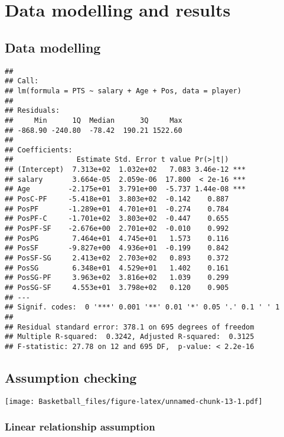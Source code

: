 \documentclass[
]{article}
\begin{document}
\hypertarget{data-modelling-and-results}{%
\section{Data modelling and results}\label{data-modelling-and-results}}

\hypertarget{data-modelling}{%
\subsection{Data modelling}\label{data-modelling}}

\begin{verbatim}
## 
## Call:
## lm(formula = PTS ~ salary + Age + Pos, data = player)
## 
## Residuals:
##     Min      1Q  Median      3Q     Max 
## -868.90 -240.80  -78.42  190.21 1522.60 
## 
## Coefficients:
##               Estimate Std. Error t value Pr(>|t|)    
## (Intercept)  7.313e+02  1.032e+02   7.083 3.46e-12 ***
## salary       3.664e-05  2.059e-06  17.800  < 2e-16 ***
## Age         -2.175e+01  3.791e+00  -5.737 1.44e-08 ***
## PosC-PF     -5.418e+01  3.803e+02  -0.142    0.887    
## PosPF       -1.289e+01  4.701e+01  -0.274    0.784    
## PosPF-C     -1.701e+02  3.803e+02  -0.447    0.655    
## PosPF-SF    -2.676e+00  2.701e+02  -0.010    0.992    
## PosPG        7.464e+01  4.745e+01   1.573    0.116    
## PosSF       -9.827e+00  4.936e+01  -0.199    0.842    
## PosSF-SG     2.413e+02  2.703e+02   0.893    0.372    
## PosSG        6.348e+01  4.529e+01   1.402    0.161    
## PosSG-PF     3.963e+02  3.816e+02   1.039    0.299    
## PosSG-SF     4.553e+01  3.798e+02   0.120    0.905    
## ---
## Signif. codes:  0 '***' 0.001 '**' 0.01 '*' 0.05 '.' 0.1 ' ' 1
## 
## Residual standard error: 378.1 on 695 degrees of freedom
## Multiple R-squared:  0.3242, Adjusted R-squared:  0.3125 
## F-statistic: 27.78 on 12 and 695 DF,  p-value: < 2.2e-16
\end{verbatim}

\hypertarget{assumption-checking}{%
\subsection{Assumption checking}\label{assumption-checking}}

\texttt{[image: Basketball\_files/figure-latex/unnamed-chunk-13-1.pdf]}

\hypertarget{linear-relationship-assumption}{%
\subsubsection{Linear relationship
assumption}\label{linear-relationship-assumption}}
\end{document}

